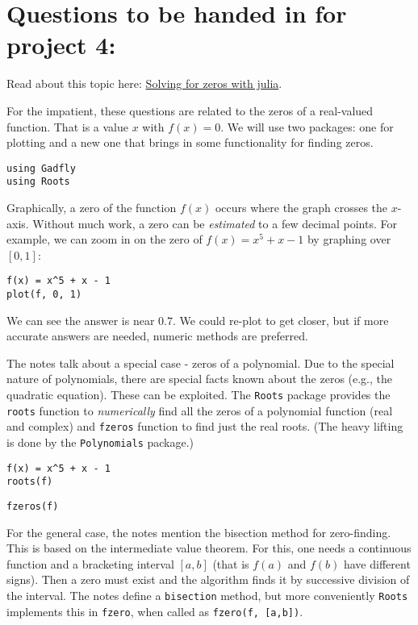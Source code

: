 \documentclass[12pt]{article}
\begin{document}
\section{Questions to be handed in for project 4:}

Read about this topic here:
\href{http://mth229.github.io/zeros.html}{Solving for zeros with julia}.

For the impatient, these questions are related to the zeros of a
real-valued function. That is a value $x$ with $f(x)=0$. We will use two
packages: one for plotting and a new one that brings in some
functionality for finding zeros.



\begin{verbatim}
using Gadfly        
using Roots
\end{verbatim}
Graphically, a zero of the function $f(x)$ occurs where the graph
crosses the $x$-axis. Without much work, a zero can be \emph{estimated}
to a few decimal points. For example, we can zoom in on the zero of
$f(x) = x^5 + x - 1$ by graphing over $[0,1]$:



\begin{verbatim}
f(x) = x^5 + x - 1
plot(f, 0, 1)
\end{verbatim}
We can see the answer is near $0.7$. We could re-plot to get closer, but
if more accurate answers are needed, numeric methods are preferred.

The notes talk about a special case - zeros of a polynomial. Due to the
special nature of polynomials, there are special facts known about the
zeros (e.g., the quadratic equation). These can be exploited. The
\texttt{Roots} package provides the \texttt{roots} function to
\emph{numerically} find all the zeros of a polynomial function (real and
complex) and \texttt{fzeros} function to find just the real roots. (The
heavy lifting is done by the \texttt{Polynomials} package.)



\begin{verbatim}
f(x) = x^5 + x - 1
roots(f)
\end{verbatim}


\begin{verbatim}
fzeros(f)
\end{verbatim}
For the general case, the notes mention the bisection method for
zero-finding. This is based on the intermediate value theorem. For this,
one needs a continuous function and a bracketing interval $[a,b]$ (that
is $f(a)$ and $f(b)$ have different signs). Then a zero must exist and
the algorithm finds it by successive division of the interval. The notes
define a \texttt{bisection} method, but more conveniently \texttt{Roots}
implements this in \texttt{fzero}, when called as
\texttt{fzero(f, {[}a,b{]})}.
\end{document}
